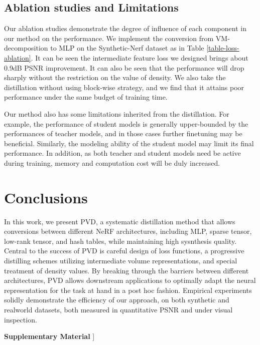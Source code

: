 \documentclass[letterpaper]{article} \usepackage{aaai23}  \usepackage{times}  \usepackage{helvet}  \usepackage{courier}  \usepackage[hyphens]{url}  \usepackage{graphicx} \urlstyle{rm} \def\UrlFont{\rm}  \usepackage{natbib}  \usepackage{caption} \frenchspacing  \setlength{\pdfpagewidth}{8.5in}  \setlength{\pdfpageheight}{11in}  \usepackage{multirow}
\begin{document}
\subsection{Ablation studies and Limitations}
Our ablation studies demonstrate the degree of influence of each component in our method on the performance. We implement the conversion from VM-decomposition to MLP on the Synthetic-Nerf dataset as in Table \ref{table-loss-ablation}. It can be seen the intermediate feature loss we designed brings about 0.9dB PSNR improvement. It can also be seen that the performance will drop sharply without the restriction on the value of density. We also take the distillation without using block-wise strategy, and we find that it attains poor performance under the same budget of training time.


Our method also has some limitations inherited from the distillation. For example, the performance of student models is generally upper-bounded by the performances of teacher models, and in those cases further finetuning may be beneficial. Similarly, the modeling ability of the student model may limit its final performance. In addition, as both teacher and student models need be active during training, memory and computation cost will be duly increased. 


\section{Conclusions}
In this work, we present PVD, a systematic distillation method that allows conversions between different NeRF architectures, including MLP, sparse tensor, low-rank tensor, and hash tables, while maintaining high sysnthesis quality. Central to the success of PVD is careful design of loss functions, a progressive distilling schemes utilizing intermediate volume representations, and special treatment of density values. By breaking through the barriers between different architectures, PVD allows downstream applications to optimally adapt the neural representation for the task at hand in a post hoc fashion. Empirical experiments solidly demonstrate the efficiency of our approach, on both synthetic and realworld datasets, both measured in quantitative PSNR and under visual inspection.


\begin{center}
    \Large
     \textcolor[rgb]{0.,0.18,0.85}{\textbf{Supplementary Material}}
    \18pt]
    \normalsize 
\end{center}
\end{document}
